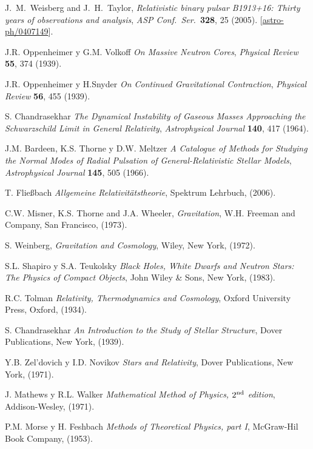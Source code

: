 \begin{thebibliography}{99}
 J.~M.~Weisberg and J.~H.~Taylor, {\em Relativistic binary pulsar B1913+16: Thirty years of observations and analysis}, {\sl ASP Conf.\ Ser.}\  {\bf 328}, 25 (2005). [\href{http://arxiv.org/abs/astro-ph/0407149}{astro-ph/0407149}].

 J.R. Oppenheimer y G.M. Volkoff {\em On Massive Neutron Cores}, {\sl Physical Review} {\bf 55}, 374 (1939).

 J.R. Oppenheimer y H.Snyder {\em On Continued Gravitational Contraction}, {\sl Physical Review} {\bf 56}, 455 (1939).

 S. Chandrasekhar {\em The Dynamical Instability of Gaseous Masses Approaching the Schwarzschild Limit in General Relativity}, {\sl Astrophysical Journal} {\bf 140}, 417 (1964).

 J.M. Bardeen, K.S. Thorne y D.W. Meltzer {\em A Catalogue of Methods for Studying the Normal Modes of Radial Pulsation of General-Relativistic Stellar Models}, {\sl Astrophysical Journal} {\bf 145}, 505 (1966).

 T. Flie\ss bach {\em Allgemeine Relativit\"atstheorie}, Spektrum Lehrbuch, (2006).

 C.W. Misner, K.S. Thorne and J.A. Wheeler, {\em Gravitation},
W.H. Freeman and Company, San Francisco, (1973).

 S. Weinberg, {\em Gravitation and Cosmology}, Wiley, New
York, (1972).

 S.L. Shapiro y S.A. Teukolsky {\em Black Holes, White Dwarfs and Neutron Stars: The Physics of Compact Objects}, John Wiley \& Sons, New York, (1983).

 R.C. Tolman {\em Relativity, Thermodynamics and Cosmology}, Oxford University Press, Oxford, (1934).

 S. Chandrasekhar {\em An Introduction to the Study of Stellar Structure}, Dover Publications, New York, (1939).


 Y.B. Zel'dovich y I.D. Novikov {\em Stars and Relativity}, Dover Publications, New York, (1971).

 J. Mathews y R.L. Walker {\em Mathematical Method of Physics, $2^{\rm nd}$ edition}, Addison-Wesley, (1971).

 P.M. Morse y H. Feshbach {\em Methods of Theoretical Physics, part I}, McGraw-Hil Book Company,  (1953).


\end{thebibliography}
